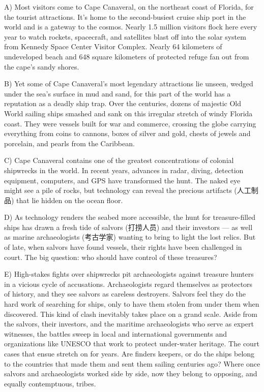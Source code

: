 \documentclass[UTF8,11pt]{ctexart}
\begin{document}
A) Most visitors come to Cape Canaveral, on the northeast coast of Florida, for the tourist attractions. It’s home to the second-busiest cruise ship port in the world and is a gateway to the cosmos. Nearly 1.5 million visitors flock here every year to watch rockets, spacecraft, and satellites blast off into the solar system from Kennedy Space Center Visitor Complex. Nearly 64 kilometers of undeveloped beach and 648 square kilometers of protected refuge fan out from the cape’s sandy shores.


B) Yet some of Cape Canaveral’s most legendary attractions lie unseen, wedged under the sea’s surface in mud and sand, for this part of the world has a reputation as a deadly ship trap. Over the centuries, dozens of majestic Old World sailing ships smashed and sank on this irregular stretch of windy Florida coast. They were vessels built for war and commerce, crossing the globe carrying everything from coins to cannons, boxes of silver and gold, chests of jewels and porcelain, and pearls from the Caribbean.


C) Cape Canaveral contains one of the greatest concentrations of colonial shipwrecks in the world. In recent years, advances in radar, diving, detection equipment, computers, and GPS have transformed the hunt. The naked eye might see a pile of rocks, but technology can reveal the precious artifacts (人工制品) that lie hidden on the ocean floor.


D) As technology renders the seabed more accessible, the hunt for treasure-filled ships has drawn a fresh tide of salvors (打捞人员) and their investors — as well as marine archaeologists (考古学家) wanting to bring to light the lost relics. But of late, when salvors have found vessels, their rights have been challenged in court. The big question: who should have control of these treasures?


E) High-stakes fights over shipwrecks pit archaeologists against treasure hunters in a vicious cycle of accusations. Archaeologists regard themselves as protectors of history, and they see salvors as careless destroyers. Salvors feel they do the hard work of searching for ships, only to have them stolen from under them when discovered. This kind of clash inevitably takes place on a grand scale. Aside from the salvors, their investors, and the maritime archaeologists who serve as expert witnesses, the battles sweep in local and international governments and organizations like UNESCO that work to protect under-water heritage. The court cases that ensue stretch on for years. Are finders keepers, or do the ships belong to the countries that made them and sent them sailing centuries ago? Where once salvors and archaeologists worked side by side, now they belong to opposing, and equally contemptuous, tribes.
\end{document}
